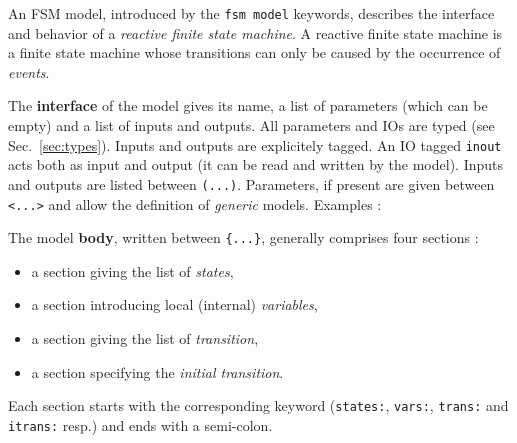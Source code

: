 An FSM model, introduced by the \verb|fsm model| keywords, describes the interface and behavior of a
\emph{reactive finite state machine}. A reactive finite state machine is a finite state machine
whose transitions can only be caused by the occurrence of \emph{events}.

\begin{center}
\end{center}

\medskip The \textbf{interface} of the model gives its name, a list of parameters (which can be
empty) and a list of inputs and outputs. All parameters and IOs are typed (see
Sec.~\ref{sec:types}). Inputs and outputs are explicitely tagged. An IO tagged \verb|inout| acts
both as input and output (it can be read and written by the model). Inputs and outputs are listed
between \verb|(...)|. Parameters, if present are given between \verb|<...>| and allow the
definition of \emph{generic} models. Examples :

\begin{center}
\end{center}

\begin{center}
\end{center}

\begin{center}
\end{center}

\medskip
The model \textbf{body}, written between \verb|{...}|, generally comprises four sections :
\begin{itemize}
\item a section giving the list of \emph{states},
\item a section introducing local (internal) \emph{variables},
\item a section giving the list of \emph{transition},
\item a section specifying the \emph{initial transition}.
\end{itemize}

Each section starts with the corresponding keyword (\verb|states:|, \verb|vars:|, \verb|trans:| and
\verb|itrans:| resp.) and ends with a semi-colon.

